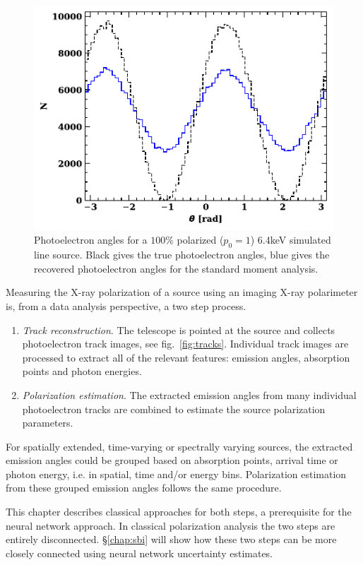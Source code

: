 \begin{figure}[t]
\centering
\includegraphics[scale=1]{figures/mod_example.pdf}
\caption{Photoelectron angles for a $100\%$ polarized ($p_0 = 1$) 6.4keV simulated line source. Black gives the true photoelectron angles, blue gives the recovered photoelectron angles for the standard moment analysis.}
\label{fig:mu}       %
\end{figure}

Measuring the X-ray polarization of a source using an imaging X-ray polarimeter is, from a data analysis perspective, a two step process. 
\begin{enumerate}
    \item \textit{Track reconstruction}. The telescope is pointed at the source and collects photoelectron track images, see fig.~\ref{fig:tracks}. Individual track images are processed to extract all of the relevant features: emission angles, absorption points and photon energies. \\
    
    \item \textit{Polarization estimation}. The extracted emission angles from many individual photoelectron tracks are combined to estimate the source polarization parameters.
\end{enumerate}
For spatially extended, time-varying or spectrally varying sources, the extracted emission angles could be grouped based on absorption points, arrival time or photon energy, i.e. in spatial, time and/or energy bins. Polarization estimation from these grouped emission angles follows the same procedure.

This chapter describes classical approaches for both steps, a prerequisite for the neural network approach. In classical polarization analysis the two steps are entirely disconnected. \S\ref{chap:sbi} will show how these two steps can be more closely connected using neural network uncertainty estimates.

